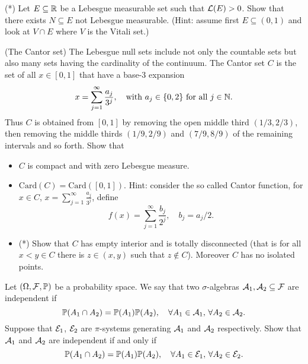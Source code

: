 \begin{problem}(*) Let $E\subseteq \mathbb R$ be a Lebesgue measurable set such that $\mathcal L(E)>0$. Show that there exists $N\subseteq E$ not Lebesgue measurable. (Hint: assume first $E\subseteq (0,1)$ and look at $V\cap E$ where $V$ is the Vitali set.) 
    \end{problem}
    
\begin{problem}(The Cantor set) The Lebesgue null sets include not only the countable sets but also many sets having the cardinality of the continuum. The Cantor set $C$ is the set of all $x \in [0, 1]$ that have a base-$3$ expansion
        \begin{equation*}
            x = \sum_{j=1}^\infty \frac{a_j}{3^j},\quad \text{with $a_j\in\{0,2\}$ for all $j\in \mathbb N$.}
        \end{equation*} 
        Thus $C$ is obtained from $[0,1]$ by removing the open middle third $(1/3,2/3)$, then removing the middle thirds $(1/9,2/9)$ and $(7/9,8/9)$ of the remaining intervals and so forth.
        Show that 
        \begin{itemize}
            \item $C$ is compact and with zero Lebesgue measure.
            \item $\mathrm{Card}(C) = \mathrm{Card}([0,1])$. Hint: consider the so called Cantor function, for $x\in C$, $x=\sum_{j=1}^\infty \frac{a_j}{3^j}$, define
            \begin{equation*}
                f(x) =\sum_{j=1}^\infty \frac{b_j}{2^j},\quad b_j=a_j/2.
            \end{equation*}
            \item (*) Show that $C$ has empty interior and is totally disconnected (that is for all $x<y\in C$ there is $z\in(x,y)$ such that $z\notin C$). Moreover $C$ has no isolated points.
\end{itemize}
\end{problem}
        
\begin{problem}
    Let $(\Omega,\mathcal F,\mathbb P)$ be a probability space. We say that two $\sigma$-algebras $\mathcal A_1, \mathcal A_2\subseteq \mathcal F$ are independent if
    \begin{equation*}
        \mathbb P(A_1\cap A_2) = \mathbb P(A_1)\mathbb P(A_2),\quad \forall A_1\in\mathcal A_1,\,\forall A_2\in \mathcal A_2.
    \end{equation*}
    Suppose that $\mathcal E_1$, $\mathcal E_2$ are $\pi$-systems generating $\mathcal A_1$ and $\mathcal A_2$ respectively. Show that $\mathcal A_1$ and $\mathcal A_2$ are independent if and only if
    \begin{equation*}
        \mathbb P(A_1\cap A_2) = \mathbb P(A_1)\mathbb P(A_2),\quad \forall A_1\in\mathcal E_1,\,\forall A_2\in \mathcal E_2.
    \end{equation*} 
\end{problem}